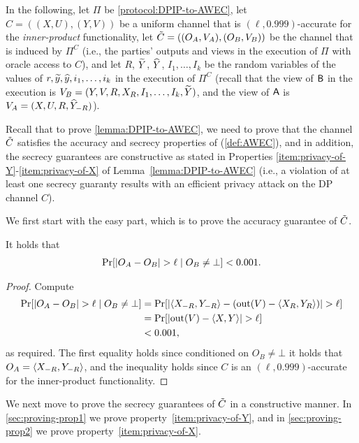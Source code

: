 In the following, let $\Pi$ be \cref{protocol:DPIP-to-AWEC},
let $C =((X,U),(Y,V))$ be a uniform channel that is $(\ell,0.999)$-accurate for the \emph{inner-product} functionality, let $\tilde{C} = ((O_A,V_A),(O_B,V_B))$ be the channel that is induced by $\Pi^C$ (i.e., the parties' outputs and views in the execution of $\Pi$ with oracle access to $C$), and let $R$, $\widetilde{Y}$, $\widehat{Y}$, $I_1,\ldots,I_k$ be the random variables of the values of $r, \widetilde{y}, \widehat{y}, i_1,\ldots,i_k$ in the execution of $\Pi^C$ (recall that the view of $\mathsf{B}$ in the execution is $V_B = (Y, V, R, X_R, I_1,\ldots,I_k, \widetilde{Y})$, and the view of $\mathsf{A}$ is $V_A = (X, U, R, \widehat{Y}_{-R})$).

Recall that to prove \cref{lemma:DPIP-to-AWEC}, we need to prove that the channel $\tC$ satisfies the accuracy and secrecy properties of \AWEC (\cref{def:AWEC}), and in addition, the secrecy guarantees are constructive as stated in Properties \ref{item:privacy-of-Y}-\ref{item:privacy-of-X} of Lemma~\ref{lemma:DPIP-to-AWEC} (i.e., a violation of at least one secrecy guaranty results with an efficient privacy attack on the DP channel $C$).

We first start with the easy part, which is to prove the accuracy guarantee of $\tC$.

\begin{claim}[Accuracy of $\tC$]
	It holds that
	\begin{align*}
		\pr{\size{O_A - O_B} > \ell \mid O_B \neq \bot} < 0.001. 
	\end{align*}
\end{claim}
\begin{proof}
    Compute
    \begin{align*}
        \pr{\size{O_A - O_B} > \ell \mid O_B \neq \bot}
        &= \pr{\size{\ip{X_{-R},Y_{-R}} - \paren{\out(V) - \ip{X_R,Y_R}}} > \ell}\\
        &= \pr{\size{\out(V) - \ip{X,Y}} > \ell}\\
        &< 0.001,
    \end{align*}
    as required. The first equality holds since conditioned on $O_B \neq \bot$ it holds that $O_A = \langle X_{-R},Y_{-R} \rangle$, and the inequality holds since $C$ is an $(\ell,0.999)$-accurate for the inner-product functionality. 
\end{proof}

We next move to prove the secrecy guarantees of $\tC$ in a constructive manner. 
In \cref{sec:proving-prop1} we prove property~\ref{item:privacy-of-Y}, and in \cref{sec:proving-prop2} we prove property~\ref{item:privacy-of-X}.



